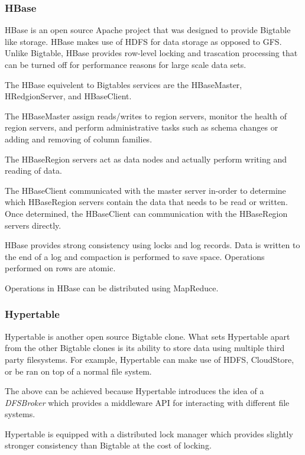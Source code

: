 \documentclass[]{article}
\begin{document}
\subsubsection{HBase}
HBase is an open source Apache project that was designed to provide Bigtable like storage\cite{khetrapal_hbase_2006}. HBase makes use of HDFS for data storage as opposed to GFS. Unlike Bigtable, HBase provides row-level locking and trascation processing that can be turned off for performance reasons for large scale data sets\cite{chen_big_2014}.

The HBase equivelent to Bigtables services are the HBaseMaster, HRedgionServer, and HBaseClient.

The HBaseMaster assign reads/writes to region servers, monitor the health of region servers, and perform administrative tasks such as schema changes or adding and removing of column families.

The HBaseRegion servers act as data nodes and actually perform writing and reading of data.

The HBaseClient communicated with the master server in-order to determine which HBaseRegion servers contain the data that needs to be read or written. Once determined, the HBaseClient can communication with the HBaseRegion servers directly.

HBase provides strong consistency using locks and log records. Data is written to the end of a log and compaction is performed to save space\cite{cattell_scalable_2011}. Operations performed on rows are atomic.

Operations in HBase can be distributed using MapReduce.

\subsubsection{Hypertable}
Hypertable is another open source Bigtable clone\cite{khetrapal_hbase_2006}. What sets Hypertable apart from the other Bigtable clones is its ability to store data using multiple third party filesystems. For example, Hypertable can make use of HDFS, CloudStore, or be ran on top of a normal file system.

The above can be achieved because Hypertable introduces the idea of a \textit{DFSBroker} which provides a middleware API for interacting with different file systems.

Hypertable is equipped with a distributed lock manager which provides slightly stronger consistency than Bigtable at the cost of locking\cite{chen_big_2014}.
\end{document}
